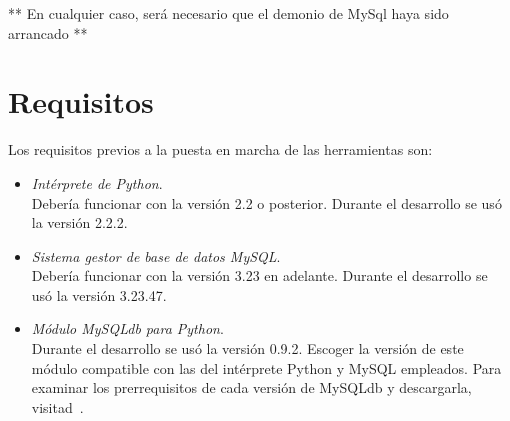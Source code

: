 ** En cualquier caso, será necesario que el demonio de MySql haya sido arrancado **


\section{Requisitos}
Los requisitos previos a la puesta en marcha de las herramientas son:
\begin{itemize}
\item \textit{Intérprete de Python}. \\
Debería funcionar con la versión 2.2 o posterior. Durante el desarrollo se usó
la versión 2.2.2.
\item \textit{Sistema gestor de base de datos MySQL}. \\
Debería funcionar con la versión 3.23 en adelante. Durante el desarrollo se usó
la versión 3.23.47.
\item \textit{Módulo MySQLdb para Python}. \\
Durante el desarrollo se usó la versión 0.9.2. Escoger la versión de este módulo
compatible con las del intérprete Python y MySQL empleados. Para examinar los
prerrequisitos de cada versión de MySQLdb y descargarla, visitad~\cite{SQLdb}.
\end{itemize}
